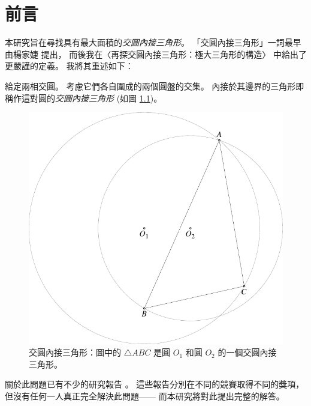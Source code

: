 \chapter{前言}

本研究旨在尋找具有最大面積的\emph{交圓內接三角形}。
「交圓內接三角形」一詞最早由楊家婕 \cite{yang} 提出，
而後我在〈再探交圓內接三角形：極大三角形的構造〉\cite{liu} 中給出了更嚴謹的定義。
我將其重述如下：

\begin{definition}[交圓內接三角形]
給定兩相交圓。
考慮它們各自圍成的兩個圓盤的交集。
內接於其邊界的三角形即稱作這對圓的\emph{交圓內接三角形} (如圖 \ref{fig:triangleincircles})。
\begin{figure}
\centering
\includegraphics{graphics/triangleincircles}
\caption{交圓內接三角形：圖中的 $\triangle ABC$ 是圓 $O_1$ 和圓 $O_2$ 的一個交圓內接三角形。}
\label{fig:triangleincircles}
\end{figure}
\end{definition}


關於此問題已有不少的研究報告 \cite{chen, chien, yang, liu}。
這些報告分別在不同的競賽取得不同的獎項，
但沒有任何一人真正完全解決此問題——
而本研究將對此提出完整的解答。
